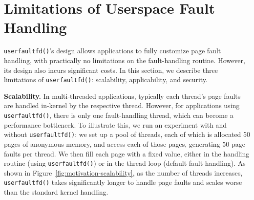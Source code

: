\section{Limitations of Userspace Fault Handling}
\label{sec:motivation}

\texttt{userfaultfd()}'s design allows applications to fully customize page fault handling, with practically no limitations on the fault-handling routine. However, its design also incurs significant costs. In this section, we describe three limitations of \texttt{userfaultfd()}: scalability, applicability, and security.

\textbf{Scalability.}
In multi-threaded applications, typically each thread's page faults are handled in-kernel by the respective thread. However, for applications using \texttt{userfaultfd()}, there is only one fault-handling thread, which can become a performance bottleneck. To illustrate this, we run an experiment with and without \texttt{userfaultfd()}: we set up a pool of threads, each of which is allocated 50 pages of anonymous memory, and access each of those pages, generating 50 page faults per thread. We then fill each page with a fixed value, either in the handling routine (using \texttt{userfaultfd()}) or in the thread loop (default fault handling). As shown in Figure~\ref{fig:motivation-scalability}, as the number of threads increases, \texttt{userfaultfd()} takes significantly longer to handle page faults and scales worse than the standard kernel handling.




